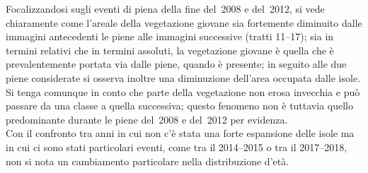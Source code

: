 Focalizzandosi sugli eventi di piena della fine del~2008 e del~2012, si vede chiaramente come l'areale della vegetazione giovane sia fortemente diminuito dalle immagini antecedenti le piene alle immagini successive (tratti \numrange[range-phrase={ e }]{11}{17});
sia in termini relativi che in termini assoluti, la vegetazione giovane è quella che è prevalentemente portata via dalle piene, quando è presente;
in seguito alle due piene considerate si osserva inoltre una diminuzione dell'area occupata dalle isole.
Si tenga comunque in conto che parte della vegetazione non erosa invecchia e può passare da una classe a quella successiva; questo fenomeno non è tuttavia quello predominante durante le piene del~2008 e del~2012 per evidenza.
\\
Con il confronto tra anni in cui non c'è stata una forte espansione delle isole ma in cui ci sono stati particolari eventi, come tra il \numrange[range-phrase={ e il }]{2014}{2015} o tra il \numrange[range-phrase={ e il }]{2017}{2018}, non si nota un cambiamento particolare nella distribuzione d'età.


















